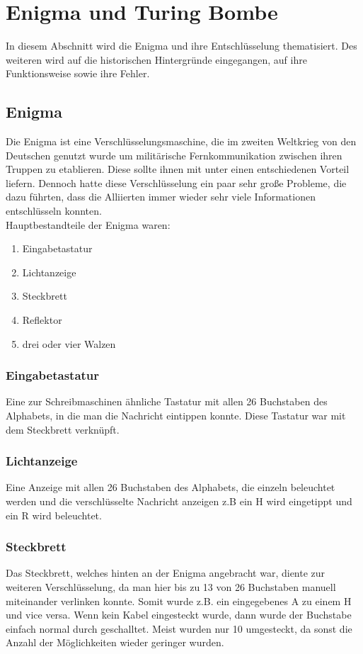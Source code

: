 \section{Enigma und Turing Bombe}
\label{enigma}
In diesem Abschnitt wird die Enigma und ihre Entschlüsselung thematisiert. Des weiteren wird auf die historischen Hintergründe eingegangen, auf ihre Funktionsweise sowie ihre Fehler.

\subsection{Enigma}
Die Enigma ist eine Verschlüsselungsmaschine, die im zweiten Weltkrieg von den Deutschen genutzt wurde um militärische Fernkommunikation zwischen ihren Truppen zu etablieren. Diese sollte ihnen mit unter einen entschiedenen Vorteil liefern. Dennoch hatte diese Verschlüsselung ein paar sehr große Probleme, die dazu führten, dass die Alliierten immer wieder sehr viele Informationen entschlüsseln konnten.\\
Hauptbestandteile der Enigma waren:
\begin{enumerate}
\item Eingabetastatur
\item Lichtanzeige
\item Steckbrett
\item Reflektor
\item drei oder vier Walzen
\end{enumerate}

\subsubsection{Eingabetastatur}
Eine zur Schreibmaschinen ähnliche Tastatur mit allen 26 Buchstaben des Alphabets, in die man die Nachricht eintippen konnte. Diese Tastatur war mit dem Steckbrett verknüpft.

\subsubsection{Lichtanzeige}
Eine Anzeige mit allen 26 Buchstaben des Alphabets, die einzeln beleuchtet werden und die verschlüsselte Nachricht anzeigen z.B ein H wird eingetippt und ein R wird beleuchtet.

\subsubsection{Steckbrett}
\label{sec:steck}
Das Steckbrett, welches hinten an der Enigma angebracht war, diente zur weiteren Verschlüsselung, da man hier bis zu 13 von 26 Buchstaben manuell miteinander verlinken konnte. Somit wurde z.B. ein eingegebenes A zu einem H und vice versa. Wenn kein Kabel eingesteckt wurde, dann wurde der Buchstabe einfach normal durch geschalltet. Meist wurden nur 10 umgesteckt, da sonst die Anzahl der Möglichkeiten wieder geringer wurden.

